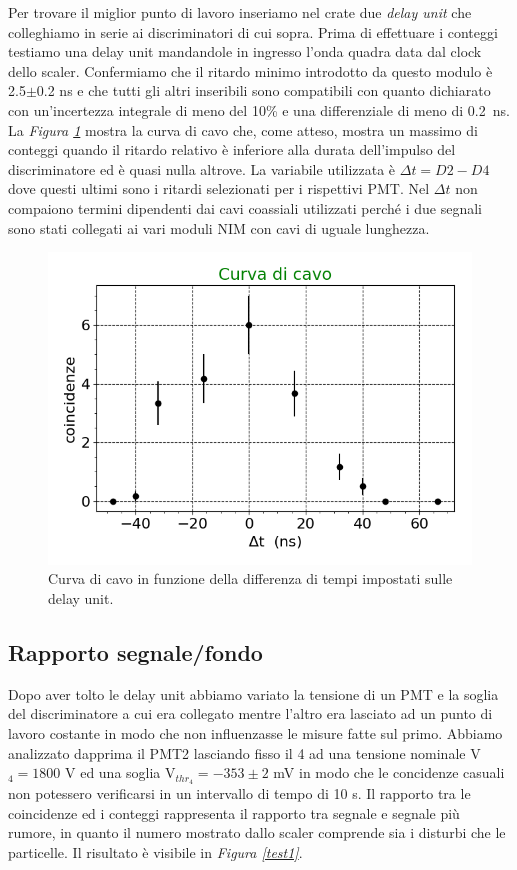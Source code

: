 \documentclass[a4paper]{article}
\begin{document}
Per trovare il miglior punto di lavoro inseriamo nel crate due \emph{delay unit} che colleghiamo in serie ai discriminatori di cui sopra. Prima di effettuare i conteggi testiamo una delay unit mandandole in ingresso l'onda quadra data dal clock dello scaler. Confermiamo che il ritardo minimo introdotto da questo modulo è 2.5$\pm$0.2\! ns e che tutti gli altri inseribili sono compatibili con quanto dichiarato con un'incertezza integrale di meno del 10\% e una differenziale di meno di \SI{0.2}{ns}. La \emph{Figura \ref{curv}} mostra la curva di cavo che, come atteso, mostra un massimo di conteggi quando il ritardo relativo è inferiore alla durata dell'impulso del discriminatore ed è quasi nulla altrove. La variabile utilizzata è $\Delta t=D2-D4$ dove questi ultimi sono i ritardi selezionati per i rispettivi PMT. Nel $\Delta t$ non compaiono termini dipendenti dai cavi coassiali utilizzati perché i due segnali sono stati collegati ai vari moduli NIM con cavi di uguale lunghezza.

\begin{figure}[h]
\centering
\includegraphics[width=8 cm]{curva_cavo}
\caption{Curva di cavo in funzione della differenza di tempi impostati sulle delay unit.}
\label{curv}
\end{figure}



\subsection*{Rapporto segnale/fondo}

%

Dopo aver tolto le delay unit abbiamo variato la tensione di un PMT  e la soglia del discriminatore a cui era collegato mentre l'altro era lasciato ad un punto di lavoro costante in modo che non influenzasse le misure fatte sul primo. Abbiamo analizzato dapprima il PMT2 lasciando fisso il 4 ad una tensione nominale V$_4=1800$\! V ed una soglia V$_{thr_4}=-353\pm2$\! mV in modo che le concidenze casuali non potessero verificarsi in un intervallo di tempo di 10\! s. 
Il rapporto tra le coincidenze ed i conteggi rappresenta il rapporto tra segnale e segnale più rumore, in quanto il numero mostrato dallo scaler comprende sia i disturbi che le particelle. Il risultato è visibile in \emph{Figura \ref{test1}}.
\end{document}
